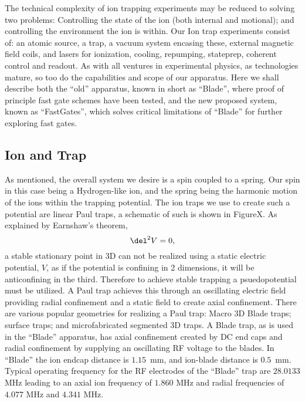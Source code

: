 \documentclass[12pt]{iopart}
\begin{document}
The technical complexity of ion trapping experiments may be reduced to
solving two problems: Controlling the state of the ion (both internal
and motional); and controlling the environment the ion is within.
Our Ion trap experiments consist of: an atomic source, a trap, a
vacuum system encasing these, external magnetic field coils, and
lasers for ionization, cooling, repumping, stateprep, coherent
control and readout.
As with all ventures in experimental physics, as technologies mature, so
too do the capabilities and scope of our apparatus.  Here we shall
describe both the ``old'' apparatus, known in short as ``Blade'', where
proof of principle fast gate schemes have been tested, and the new
proposed system, known as ``FastGates'', which solves critical
limitations of ``Blade'' for further exploring fast gates.

\subsection{Ion and Trap}

As mentioned, the overall system we desire is a spin coupled to a
spring. Our spin in this case being a Hydrogen-like ion, and the
spring being the harmonic motion of the ions within the trapping
potential. The ion traps we use to create such a potential are linear
Paul traps, a schematic of such is shown in FigureX. As explained by
Earnshaw's theorem,
$$\del^2 V = 0,$$
a stable stationary point in 3D can not be realized using a static
electric potential, $V$, as if the potential is confining in 2
dimensions, it will be anticonfining in the third. Therefore to
achieve stable trapping a psuedopotential must be utilized.
A Paul trap achieves this through an oscillating electric field
providing radial confinement and a static field to create axial
confinement. There are various popular geometries for realizing a Paul
trap: Macro 3D Blade traps; surface traps; and microfabricated
segmented 3D traps.  A Blade trap, as is used in the ``Blade''
apparatus, has axial confinement created by DC end caps and radial
confinement by supplying an oscillating RF voltage to the blades. In
``Blade'' the ion endcap distance is $1.15$~mm, and ion-blade distance
is $0.5$~mm. Typical operating frequency for the RF electrodes of the
``Blade'' trap are $28.0133$ MHz leading to an axial ion frequency of
$1.860$ MHz and radial frequencies of $4.077$ MHz and $4.341$ MHz.
\end{document}
